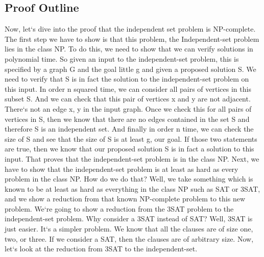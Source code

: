 \subsection{Proof Outline}
Now, let`s dive into the proof that the independent set problem is NP-complete.
The first step we have to show is that this problem, the Independent-set problem lies in the class NP\@.
To do this, we need to show that we can verify solutions in polynomial time.
So given an input to the independent-set problem, this is specified by a graph G and the goal little g and given a proposed solution S\@.
We need to verify that S is in fact the solution to the independent-set problem on this input.
In order n squared time, we can consider all pairs of vertices in this subset S\@.
And we can check that this pair of vertices x and y are not adjacent.
There`s not an edge x, y in the input graph.
Once we check this for all pairs of vertices in S, then we know that there are no edges contained in the set S and therefore S is an independent set.
And finally in order n time, we can check the size of S and see that the size of S is at least g, our goal.
If those two statements are true, then we know that our proposed solution S is in fact a solution to this input.
That proves that the independent-set problem is in the class NP\@.
Next, we have to show that the independent-set problem is at least as hard as every problem in the class NP\@.
How do we do that? Well, we take something which is known to be at least as hard as everything in the class NP such as SAT or 3SAT, and we show a reduction from that known NP-complete problem to this new problem.
We`re going to show a reduction from the 3SAT problem to the independent-set problem.
Why consider a 3SAT instead of SAT? Well, 3SAT is just easier.
It`s a simpler problem.
We know that all the clauses are of size one, two, or three.
If we consider a SAT, then the clauses are of arbitrary size.
Now, let`s look at the reduction from 3SAT to the independent-set.

